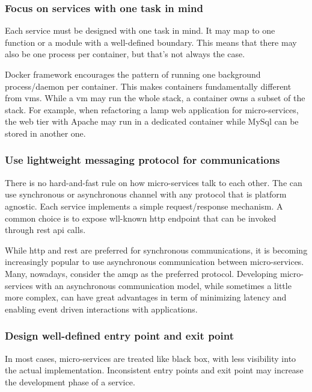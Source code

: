 \subsubsection*[Commandment 4]{Focus on services with one task in mind}
\label{sec:architecture-proposal-microservices-commandments-4}
Each service must be designed with one task in mind. It may map to one function or a module with a
well-defined boundary. This means that there may also be one process per container, but that's not
always the case.

Docker framework encourages the pattern of running one background process/daemon per container. This
makes containers fundamentally different from \ac{vm}s. While a \ac{vm} may run the whole stack, a
container owns a subset of the stack. For example, when refactoring a \ac{lamp} web application for
micro-services, the web tier with Apache may run in a dedicated container while MySql can be stored
in another one.

\subsubsection*[Commandment 5]{Use lightweight messaging protocol for communications}
\label{sec:architecture-proposal-microservices-commandments-5}
There is no hard-and-fast rule on how micro-services talk to each other. The can use synchronous or
asynchronous channel with any protocol that is platform agnostic. Each service implements a simple
request/response mechanism. A common choice is to expose wll-known \acs{http} endpoint that can be
invoked through \acs{rest} \acs{api} calls.

While \acs{http} and \acs{rest} are preferred for synchronous communications, it is becoming increasingly
popular to use asynchronous communication between micro-services. Many, nowadays, consider the \ac{amqp}
as the preferred protocol. Developing micro-services with an asynchronous communication model, while
sometimes a little more complex, can have great advantages in term of minimizing latency and enabling
event driven interactions with applications.

\subsubsection*[Commandment 6]{Design well-defined entry point and exit point}
\label{sec:architecture-proposal-microservices-commandments-6}
In most cases, micro-services are treated like black box, with less visibility into the actual
implementation. Inconsistent entry points and exit point may increase the development phase of a
service.

